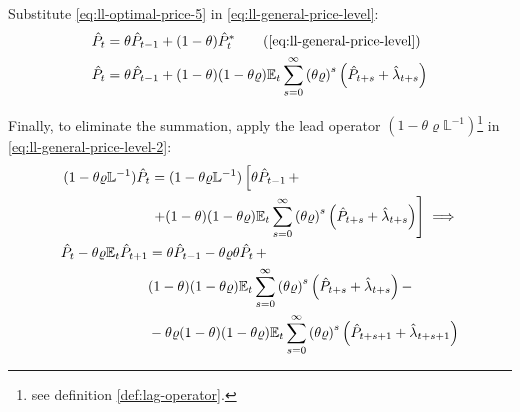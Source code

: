 \documentclass[
	thesis.tex
	]{subfiles}
\begin{document}
Substitute \ref{eq:ll-optimal-price-5} in \ref{eq:ll-general-price-level}:
\begin{align}
	\hat{P}_t &= \theta \hat{P}_{t-1} + (1-\theta) \hat{P}_t^\ast \tag{\ref{eq:ll-general-price-level}}\\
	\hat{P}_t &= \theta \hat{P}_{t-1} + (1-\theta) (1- \theta \varrho) \E \sum_{s=0}^{\infty} \left( \theta \varrho \right)^s \left( \hat{P}_{t+s} + \hat{\lambda}_{t+s} \right) \label{eq:ll-general-price-level-2}
\end{align}

Finally, to eliminate the summation, apply the lead operator $(1- \theta \varrho \mathbb{L}^{-1})$\footnote{see definition \ref{def:lag-operator}.} in \ref{eq:ll-general-price-level-2}:
\begin{align}
	\begin{split}
		(1- \theta \varrho \mathbb{L}^{-1}) \hat{P}_t &= (1- \theta \varrho \mathbb{L}^{-1}) \left[ \theta \hat{P}_{t-1} \, + \right. \\
		&\left. + (1-\theta) (1- \theta \varrho) {\mathbb{E}_{t}} \sum_{s=0}^{\infty} \left( \theta \varrho \right)^s \left( \hat{P}_{t+s} + \hat{\lambda}_{t+s} \right) \right] \implies \nonumber
	\end{split} \\
	\begin{split}
		\hat{P}_t - \theta \varrho {\mathbb{E}_{t}} \hat{P}_{t+1} &= \theta \hat{P}_{t-1} - \theta \varrho \theta \hat{P}_t \, + \\
		& (1-\theta) (1- \theta \varrho) {\mathbb{E}_{t}} \sum_{s=0}^{\infty} \left( \theta \varrho \right)^s \left( \hat{P}_{t+s} + \hat{\lambda}_{t+s} \right) - \\
		& - \theta \varrho (1-\theta) (1- \theta \varrho) {\mathbb{E}_{t}} \sum_{s=0}^{\infty} \left( \theta \varrho \right)^s \left( \hat{P}_{t+s+1} + \hat{\lambda}_{t+s+1} \right)
	\end{split} \label{eq:ll-general-price-level-3}
\end{align}
\end{document}
